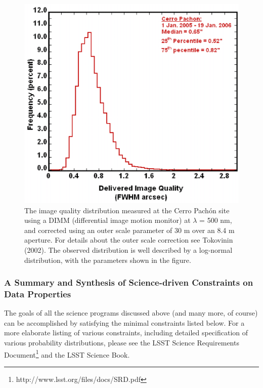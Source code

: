 \documentclass{emulateapj}
\begin{document}
\begin{figure}
\includegraphics[width=1.0\hsize,clip]{seeing2.ps}
\caption{
The image quality distribution measured at the Cerro Pach\'{o}n site using a
DIMM (differential image motion monitor) at $\lambda$ = 500 nm, and corrected 
using an outer scale parameter of 30 m over an 8.4 m aperture. For details 
about the outer scale correction see Tokovinin (2002). The observed distribution 
is well described by a log-normal distribution, with the parameters shown in 
the figure.} 
\label{Fig:seeing}
\end{figure}

\subsubsection{A Summary and Synthesis of Science-driven Constraints on Data Properties}

The goals of all the science programs discussed above 
(and many more, of course) can be accomplished by satisfying the 
minimal constraints listed below. For a more elaborate listing
of various constraints, including detailed specification of 
various probability distributions, please see the LSST Science
Requirements Document\footnote{http://www.lsst.org/files/docs/SRD.pdf}
and the LSST Science Book. 
\end{document}
